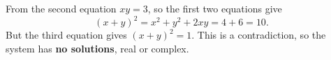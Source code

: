 From the second equation $xy=3$, so the first two equations give
\[(x+y)^2=x^2+y^2+2xy=4+6=10 .\]
But the third equation gives $(x+y)^2=1$. This is a contradiction, so the system has \textbf{no solutions}, real or complex.
